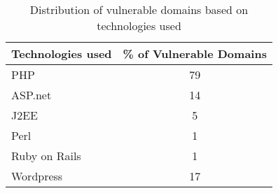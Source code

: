 \begin{table}[tbp]
	\centering
	\scriptsize
	\begin{tabular}{|l|c|}
		\hline
		Technologies used & \% of Vulnerable Domains \\
		\hline
		PHP & 79 \\
		\hline
		ASP.net & 14 \\
		\hline
		J2EE & 5 \\
		\hline
		Perl & 1 \\
		\hline
		Ruby on Rails & 1 \\
		\hline
		Wordpress & 17 \\
		\hline
	\end{tabular}
	\caption[]{Distribution of vulnerable domains based on technologies used}
	\vspace{-5ex}
	\label{tab:lang_used}
\end{table}
